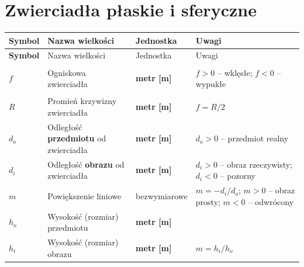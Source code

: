 \documentclass[12pt,a4paper]{article}
\begin{document}
\section{Zwierciadła płaskie i sferyczne}

\begin{longtable}{>{\bfseries}p{1.6cm} p{6.5cm} p{3.2cm} p{3.5cm}}
\toprule
\rowcolor{headercolor}
\color{white}Symbol &
\color{white}Nazwa wielkości &
\color{white}Jednostka &
\color{white}Uwagi \\
\midrule
\endfirsthead
\toprule
\rowcolor{headercolor}
\color{white}Symbol &
\color{white}Nazwa wielkości &
\color{white}Jednostka &
\color{white}Uwagi \\
\midrule
\endhead
\bottomrule
\endfoot

\rowcolor{rowzwierc}
$f$     & Ogniskowa zwierciadła
        & \textbf{metr [m]}
        & $f>0$ -- wklęsłe; $f<0$ -- wypukłe \\

\rowcolor{rowzwierc}
$R$     & Promień krzywizny zwierciadła
        & \textbf{metr [m]}
        & $f = R/2$ \\

\rowcolor{rowzwierc}
$d_o$   & Odległość \textbf{przedmiotu} od zwierciadła
        & \textbf{metr [m]}
        & $d_o > 0$ -- przedmiot realny \\

\rowcolor{rowzwierc}
$d_i$   & Odległość \textbf{obrazu} od zwierciadła
        & \textbf{metr [m]}
        & $d_i>0$ -- obraz rzeczywisty;
          $d_i<0$ -- pozorny \\

\rowcolor{rowzwierc}
$m$     & Powiększenie liniowe
        & bezwymiarowe
        & $m = -d_i/d_o$;
          $m>0$ -- obraz prosty;
          $m<0$ -- odwrócony \\

\rowcolor{rowzwierc}
$h_o$   & Wysokość (rozmiar) przedmiotu
        & \textbf{metr [m]}
        & \\

\rowcolor{rowzwierc}
$h_i$   & Wysokość (rozmiar) obrazu
        & \textbf{metr [m]}
        & $m = h_i / h_o$ \\

\end{longtable}

\end{document}
